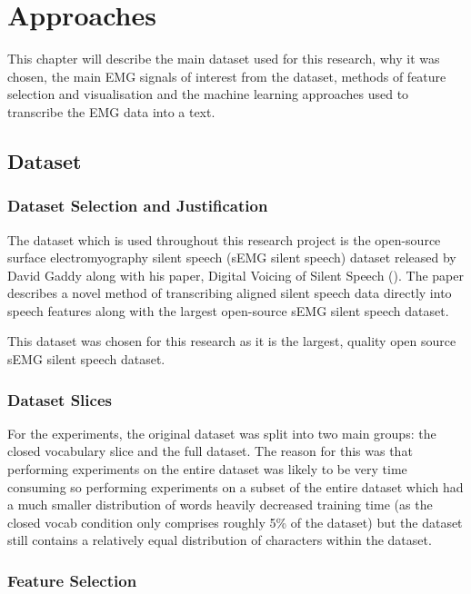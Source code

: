\chapter{Approaches} \label{chap:approaches}

This chapter will describe the main dataset used for this research, why it was chosen,
the main EMG signals of interest from the dataset, methods of feature selection and
visualisation and the machine learning approaches used to transcribe the EMG data
into a text.

\section{Dataset}

\subsection{Dataset Selection and Justification}

The dataset which is used throughout this research project is the open-source
surface electromyography silent speech (sEMG silent speech) dataset released
by David Gaddy along with his paper, Digital Voicing of Silent Speech
(\cite{gaddy2020digital}).
The paper describes a novel method of transcribing aligned silent speech data
directly into speech features along with the largest open-source sEMG silent
speech dataset.

This dataset was chosen for this research as it is the largest, quality open
source sEMG silent speech dataset.

\subsection{Dataset Slices}

For the experiments, the original dataset was split into two main groups:
the closed vocabulary slice and the full dataset. The reason for this was
that performing experiments on the entire dataset was likely to be very
time consuming so performing experiments on a subset of the entire dataset
which had a much smaller distribution of words heavily decreased training time
(as the closed vocab condition only comprises roughly 5\% of the dataset) but
the dataset still contains a relatively equal distribution of characters within
the dataset.

\subsection{Feature Selection}

